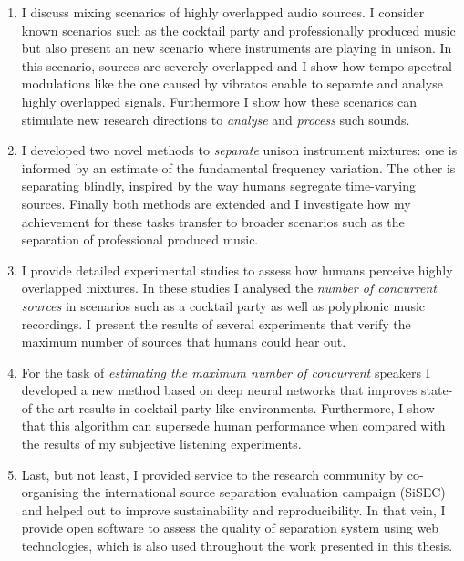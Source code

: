 \begin{enumerate}
\item I discuss mixing scenarios of highly overlapped audio sources.
I consider known scenarios such as the cocktail party and professionally produced music but also present an new scenario where instruments are playing in unison.
In this scenario, sources are severely overlapped and I show how tempo-spectral modulations like the one caused by vibratos enable to separate and analyse highly overlapped signals.
Furthermore I show how these scenarios can stimulate new research directions to \emph{analyse} and \emph{process} such sounds.\\

\item I developed two novel methods to \emph{separate} unison instrument mixtures: one is informed by an estimate of the fundamental frequency variation.
The other is separating blindly, inspired by the way humans segregate time-varying sources.
Finally both methods are extended and I investigate how my achievement for these tasks transfer to broader scenarios such as the separation of professional produced music.\\

\item I provide detailed experimental studies to assess how humans perceive highly overlapped mixtures.
In these studies I analysed the \emph{number of concurrent sources} in scenarios such as a cocktail party as well as polyphonic music recordings.
I present the results of several experiments that verify the maximum number of sources that humans could hear out.\\

\item For the task of \emph{estimating the maximum number of concurrent} speakers I developed a new method based on deep neural networks that improves state-of-the art results in cocktail party like environments.
Furthermore, I show that this algorithm can supersede human performance when compared with the results of my subjective listening experiments.\\

\item Last, but not least, I provided service to the research community by co-organising the international source separation evaluation campaign (SiSEC) and helped out to improve sustainability and reproducibility.
In that vein, I provide open software to assess the quality of separation system using web technologies, which is also used throughout the work presented in this thesis.
\end{enumerate}


